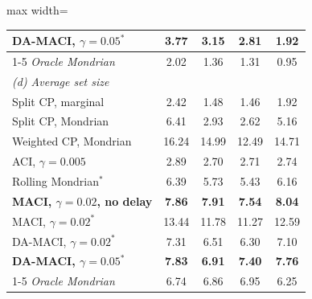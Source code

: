 \begin{table}[!t]
\begin{adjustbox}{max width=\textwidth}
\begin{tabular}{lcccc}
\textbf{DA-MACI, $\gamma=0.05^{\ast}$} & \textbf{3.77} & \textbf{3.15} & \textbf{2.81} & \textbf{1.92}\\
\cmidrule(l){1-5}
\emph{Oracle Mondrian} & 2.02 & 1.36 & 1.31 & 0.95\\
\midrule
\multicolumn{5}{l}{\emph{(d) Average set size}}\\
Split CP, marginal & 2.42 & 1.48 & 1.46 & 1.92\\
Split CP, Mondrian & 6.41 & 2.93 & 2.62 & 5.16\\
Weighted CP, Mondrian & 16.24 & 14.99 & 12.49 & 14.71\\
ACI, $\gamma=0.005$ & 2.89 & 2.70 & 2.71 & 2.74\\
Rolling Mondrian$^{\ast}$ & 6.39 & 5.73 & 5.43 & 6.16\\
\textbf{MACI, $\gamma=0.02$, no delay} & \textbf{7.86} & \textbf{7.91} & \textbf{7.54} & \textbf{8.04}\\
MACI, $\gamma=0.02^{\ast}$ & 13.44 & 11.78 & 11.27 & 12.59\\
DA-MACI, $\gamma=0.02^{\ast}$ & 7.31 & 6.51 & 6.30 & 7.10\\
\textbf{DA-MACI, $\gamma=0.05^{\ast}$} & \textbf{7.83} & \textbf{6.91} & \textbf{7.40} & \textbf{7.76}\\
\cmidrule(l){1-5}
\emph{Oracle Mondrian} & 6.74 & 6.86 & 6.95 & 6.25\\
\bottomrule
\end{tabular}\end{adjustbox}
\end{table}
